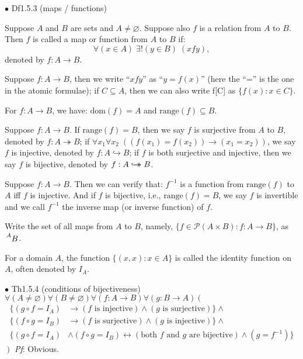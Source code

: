 \documentclass{article}
\newcommand{\hooktwoheadrightarrow}{%
        \hookrightarrow\mathrel{\mspace{-15mu}}\rightarrow}
\begin{document}
\begin{Df}{$\bullet$ Df1.5.3 (maps / functions)}
    \begin{compactenum}
        \item Suppose $A$ and $B$ are sets and $A\neq \varnothing$. Suppose also $f$ is a relation from $A$ to $B$. Then $f$ is called a map or function from $A$ to $B$ if: $$\forall (x\in A)\; \exists! (y\in B)\; (xfy),$$ denoted by $f:A\rightarrow B$.
        \item Suppose $f:A\rightarrow B$, then we write ``$xfy$'' as ``$y = f(x)$'' (here the ``='' is the one in the atomic formulae); if $C\subseteq A$, then we can also write f[C] as $\{f(x):x\in C\}$.
        \item \textcolor{Th}{For $f:A\rightarrow B$, we have: $\text{dom}(f) = A$ and $\text{range}(f)\subseteq B$.}
        \item Suppose $f:A\rightarrow B$. If $\text{range}(f) = B$, then we say $f$ is surjective from $A$ to $B$, denoted by $f: A\twoheadrightarrow B$; if $\forall x_1 \forall x_2\; \left((f(x_1) = f(x_2))\rightarrow (x_1 = x_2)\right)$, we say $f$ is injective, denoted by $f: A\hookrightarrow B$; if $f$ is both surjective and injective, then we say $f$ is bijective, denoted by $f: A\hooktwoheadrightarrow B$.
        \item \textcolor{Th}{Suppose $f: A\rightarrow B$. Then we can verify that: $f^{-1}$ is a function from $\text{range}(f)$ to $A$ iff $f$ is injective.} And if $f$ is bijective, i.e., $\text{range}(f) = B$, we say $f$ is invertible and we call $f^{-1}$ the inverse map (or inverse function) of $f$.
        \item \textcolor{Th}{Write the set of all maps from $A$ to $B$, namely, $\{f\in \mathcal{P}(A\times B): f:A\rightarrow B\}$, as $\sideset{^A}{} {\mathop{B}}$.}
        \item For a domain $A$, the function $\{(x,x): x\in A\}$ is called the identity function on $A$, often denoted by $I_A$.
    \end{compactenum}
\end{Df}

\begin{Th}{$\bullet$ Th1.5.4 (conditions of bijectiveness)}
    \textcolor{Th}{$\forall (A\neq\varnothing) \forall (B\neq\varnothing) \forall (f:A\rightarrow B) \forall (g:B\rightarrow A)\left(\right.$
    $$
    \begin{aligned}
        \{(g\circ f = I_A)&\rightarrow (f\text{ is injective})\land (g\text{ is surjective})\}\land\\
        \{(f\circ g = I_B)&\rightarrow (f\text{ is surjective})\land (g\text{ is injective})\}\land\\
        \{(g\circ f = I_A)&\land (f\circ g = I_B)\leftrightarrow (\text{both }f \text{ and } g\text{ are bijective})\land (g = f^{-1})\}
    \end{aligned}
    $$
    $\left.\right)$}
    \tcblower
    \textit{Pf}: Obvious.
\end{Th}
\end{document}
